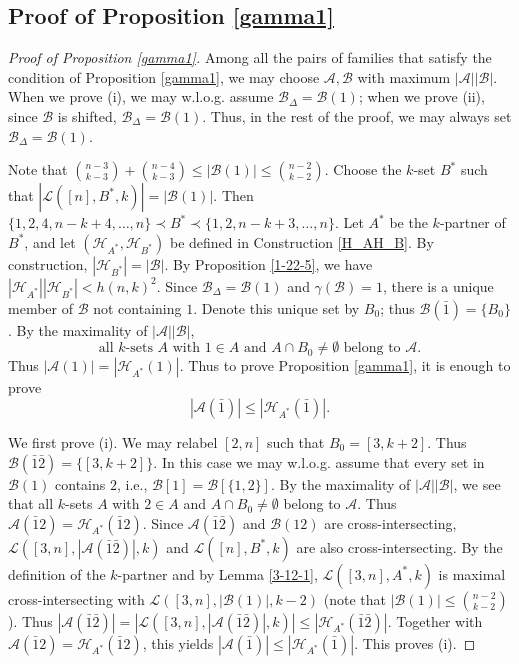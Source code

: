 \documentclass[a4paper,11pt]{article}
\newcommand{\m}{\mathcal}
\begin{document}
\subsection{Proof of Proposition \ref{gamma1} }
\begin{proof}[Proof of Proposition \ref{gamma1}]
Among all the pairs of families that satisfy the condition of Proposition \ref{gamma1}, we may choose $\m A, \m B$ with maximum $|\m A||\m B|$. 
When we prove (i), we may w.l.o.g. assume $\m B_{\Delta}=\m B(1)$; when we prove (ii), since $\m B$ is shifted,  $\m B_{\Delta}=\m B(1)$. Thus, in the rest of the proof, we may always set $\m B_{\Delta}=\m B(1)$. 

Note that ${n-3\choose k-3}+{n-4\choose k-3}\le |\mathcal B(1)|\le {n-2\choose k-2}.$
Choose the $k$-set $B^\ast$ such that $|\mathcal L([n],B^\ast,k)|=|\mathcal B(1)|.$
Then $\{1,2,4,n-k+4,\ldots,n\}\prec B^\ast
\prec \{1,2,n-k+3,\ldots,n\}.$
Let $A^\ast$ be the $k$-partner of $B^\ast$, and let
$(\mathcal H_{A^\ast},\mathcal H_{B^\ast})$ be defined in  Construction \ref{H_AH_B}. 
By construction, $|\mathcal H_{B^\ast}|=|\mathcal B|.$
By Proposition \ref{1-22-5}, we have
$|\m H_{A^\ast}||\m H_{B^\ast}|<h(n,k)^2$. 
Since $\m B_{\Delta}=\m B(1)$ and
$\gamma(\mathcal B)=1$, there is a unique member of $\mathcal B$ not
containing $1$. Denote this unique set by $B_0$; thus $\m B(\bar1)=\{B_0\}$.  
By the maximality of $|\m A||\m B|$,
\begin{equation}\label{6-17-3}
\text{all $k$-sets $A$ with $1\in A$ and $A\cap B_0\ne \emptyset$ belong to $\m A$.}
\end{equation}
Thus
$|\m A(1)|=|\m H_{A^\ast}(1)|$. 
Thus to prove Proposition \ref{gamma1}, it is enough to prove
\begin{equation}\label{gamma1-A0}
|\mathcal A(\bar1)|\le |\m H_{A^\ast}(\bar1)|.
\end{equation}




We first prove (i). 
We may relabel $[2,n]$ such that $B_0=[3,k+2].$
Thus $\mathcal B(\bar1\bar2)=\{[3,k+2]\}.$ 
In this case we may w.l.o.g. assume that every set in $\m B(1)$ contains $2$, i.e., $\m B[1]=\m B[\{1,2\}]$. 
By the maximality of $|\m A||\m B|$, we see that
all $k$-sets $A$ with $2\in A$ and $A\cap B_0\ne \emptyset$ belong to $\m A$. Thus
$\m A(\bar1 2)=\m H_{A^\ast}(\bar12)$. 
Since $\m A(\bar1\bar2)$ and $\m B(12)$ are cross-intersecting, 
$\m L([3,n],|\m A(\bar1\bar2)|,k)$ and $\mathcal L([n],B^\ast,k)$
are also cross-intersecting.
By the definition of the $k$-partner and by Lemma \ref{3-12-1},
$\mathcal L([3,n],A^\ast,k)$ is maximal cross-intersecting with
$\mathcal L([3,n],|\m B(1)|,k-2)$ (note that $|\m B(1)|\le {n-2\choose k-2}$). Thus $|\m A(\bar1\bar2)|=|\m L([3,n],|\m A(\bar1\bar2)|,k)|\le |\m H_{A^\ast}(\bar1\bar2)|$. 
Together with $\m A(\bar1 2)=\m H_{A^\ast}(\bar12)$, this yields $|\m A(\bar1)|\le |\m H_{A^\ast}(\bar1)|$. This proves (i).


\end{proof}
\end{document}
